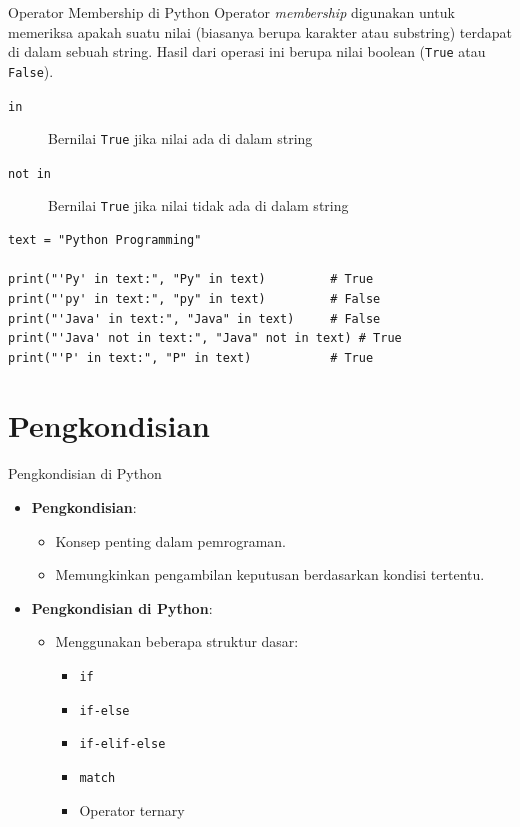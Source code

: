 \documentclass[aspectratio=169, table]{beamer}
\begin{document}
\begin{frame}[fragile]{Operator Membership di Python}
Operator \textit{membership} digunakan untuk memeriksa apakah suatu nilai (biasanya berupa karakter atau substring) 
terdapat di dalam sebuah string. Hasil dari operasi ini berupa nilai boolean (\texttt{True} atau \texttt{False}).
\begin{description}
    \item[\texttt{in}] Bernilai \texttt{True} jika nilai ada di dalam string
    \item[\texttt{not in}] Bernilai \texttt{True} jika nilai tidak ada di dalam string
\end{description}

\begin{lstlisting}[style=PythonStyle, caption={Kode Python: membership_operator.py}]
text = "Python Programming"

print("'Py' in text:", "Py" in text)         # True
print("'py' in text:", "py" in text)         # False
print("'Java' in text:", "Java" in text)     # False
print("'Java' not in text:", "Java" not in text) # True
print("'P' in text:", "P" in text)           # True
\end{lstlisting}
\end{frame}

\section{Pengkondisian}

\begin{frame}[fragile]{Pengkondisian di Python}
\begin{itemize}
\item \textbf{Pengkondisian}:
\begin{itemize}
\item Konsep penting dalam pemrograman.
\item Memungkinkan pengambilan keputusan berdasarkan kondisi tertentu.
\end{itemize}

\item \textbf{Pengkondisian di Python}:
\begin{itemize}
\item Menggunakan beberapa struktur dasar:
\begin{itemize}
	\item \texttt{if}
	\item \texttt{if-else}
	\item \texttt{if-elif-else}
	\item \texttt{match}
	\item Operator ternary
\end{itemize}
\end{itemize}
\end{itemize}
\end{frame}
\end{document}
